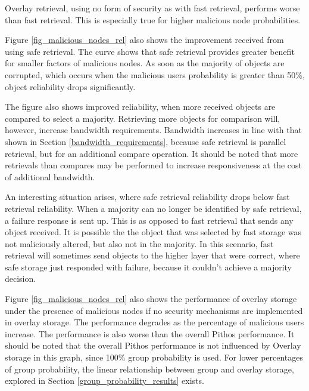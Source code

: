 Overlay retrieval, using no form of security as with fast retrieval, performs worse than fast retrieval. This is especially true for higher malicious node probabilities.

Figure \ref{fig_malicious_nodes_rel} also shows the improvement received from using safe retrieval. The curve shows that safe retrieval provides greater benefit for smaller factors of malicious nodes. As soon as the majority of objects are corrupted, which occurs when the malicious users probability is greater than 50\%, object reliability drops significantly.

The figure also shows improved reliability, when more received objects are compared to select a majority. Retrieving more objects for comparison will, however, increase bandwidth requirements. Bandwidth increases in line with that shown in Section \ref{bandwidth_requirements}, because safe retrieval is parallel retrieval, but for an additional compare operation. It should be noted that more retrievals than compares may be performed to increase responsiveness at the cost of additional bandwidth.

An interesting situation arises, where safe retrieval reliability drops below fast retrieval reliability. When a majority can no longer be identified by safe retrieval, a failure response is sent up. This is as opposed to fast retrieval that sends any object received. It is possible the the object that was selected by fast storage was not maliciously altered, but also not in the majority. In this scenario, fast retrieval will sometimes send objects to the higher layer that were correct, where safe storage just responded with failure, because it couldn't achieve a majority decision.

Figure \ref{fig_malicious_nodes_rel} also shows the performance of overlay storage under the presence of malicious nodes if no security mechanisms are implemented in overlay storage. The performance degrades as the percentage of malicious users increase. The performance is also worse than the overall Pithos performance.  It should be noted that the overall Pithos performance is not influenced by Overlay storage in this graph, since 100\% group probability is used. For lower percentages of group probability, the linear relationship between group and overlay storage, explored in Section \ref{group_probability_results} exists.

